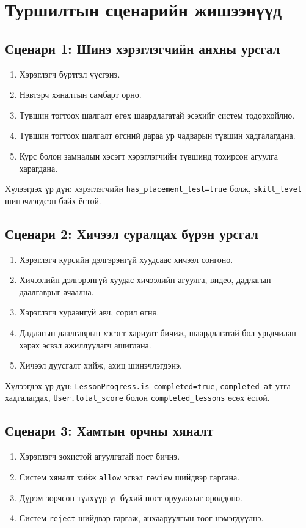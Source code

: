 \section{Туршилтын сценарийн жишээнүүд}
\subsection{Сценари 1: Шинэ хэрэглэгчийн анхны урсгал}
\begin{enumerate}
\item Хэрэглэгч бүртгэл үүсгэнэ.
\item Нэвтэрч хяналтын самбарт орно.
\item Түвшин тогтоох шалгалт өгөх шаардлагатай эсэхийг систем тодорхойлно.
\item Түвшин тогтоох шалгалт өгсний дараа ур чадварын түвшин хадгалагдана.
\item Курс болон замналын хэсэгт хэрэглэгчийн түвшинд тохирсон агуулга харагдана.
\end{enumerate}

Хүлээгдэх үр дүн: хэрэглэгчийн \texttt{has\_placement\_test=true} болж, \texttt{skill\_level} шинэчлэгдсэн байх ёстой.

\subsection{Сценари 2: Хичээл суралцах бүрэн урсгал}
\begin{enumerate}
\item Хэрэглэгч курсийн дэлгэрэнгүй хуудсаас хичээл сонгоно.
\item Хичээлийн дэлгэрэнгүй хуудас хичээлийн агуулга, видео, дадлагын даалгаврыг ачаална.
\item Хэрэглэгч хураангуй авч, сорил өгнө.
\item Дадлагын даалгаврын хэсэгт хариулт бичиж, шаардлагатай бол урьдчилан харах эсвэл ажиллуулагч ашиглана.
\item Хичээл дуусгалт хийж, ахиц шинэчлэгдэнэ.
\end{enumerate}

Хүлээгдэх үр дүн: \texttt{LessonProgress.is\_completed=true}, \texttt{completed\_at} утга хадгалагдах, \texttt{User.total\_score} болон \texttt{completed\_lessons} өсөх ёстой.

\subsection{Сценари 3: Хамтын орчны хяналт}
\begin{enumerate}
\item Хэрэглэгч зохистой агуулгатай пост бичнэ.
\item Систем хяналт хийж \texttt{allow} эсвэл \texttt{review} шийдвэр гаргана.
\item Дүрэм зөрчсөн түлхүүр үг бүхий пост оруулахыг оролдоно.
\item Систем \texttt{reject} шийдвэр гаргаж, анхааруулгын тоог нэмэгдүүлнэ.
\end{enumerate}

